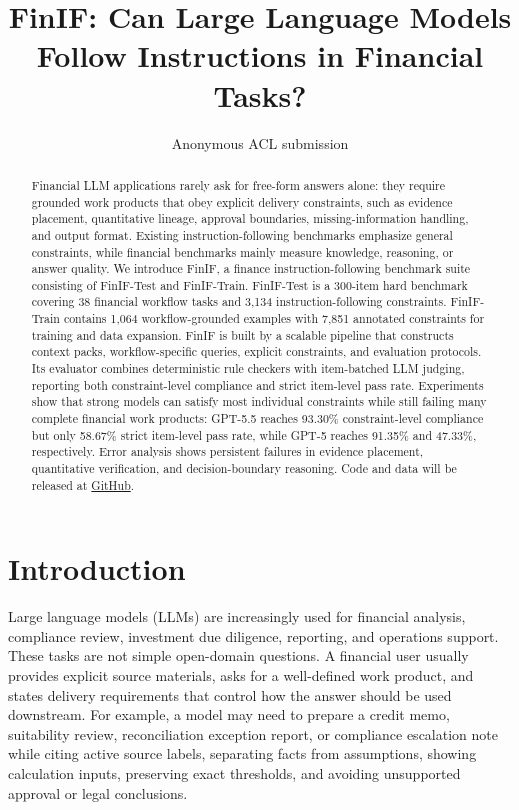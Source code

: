 \documentclass[11pt]{article}
\title{FinIF: Can Large Language Models Follow Instructions in Financial Tasks?}
\author{Anonymous ACL submission}
\date{}
\begin{document}
\maketitle

\begin{abstract}
Financial LLM applications rarely ask for free-form answers alone: they require grounded work products that obey explicit delivery constraints, such as evidence placement, quantitative lineage, approval boundaries, missing-information handling, and output format. Existing instruction-following benchmarks emphasize general constraints, while financial benchmarks mainly measure knowledge, reasoning, or answer quality. We introduce FinIF, a finance instruction-following benchmark suite consisting of FinIF-Test and FinIF-Train. FinIF-Test is a 300-item hard benchmark covering 38 financial workflow tasks and 3,134 instruction-following constraints. FinIF-Train contains 1,064 workflow-grounded examples with 7,851 annotated constraints for training and data expansion. FinIF is built by a scalable pipeline that constructs context packs, workflow-specific queries, explicit constraints, and evaluation protocols. Its evaluator combines deterministic rule checkers with item-batched LLM judging, reporting both constraint-level compliance and strict item-level pass rate. Experiments show that strong models can satisfy most individual constraints while still failing many complete financial work products: GPT-5.5 reaches 93.30\% constraint-level compliance but only 58.67\% strict item-level pass rate, while GPT-5 reaches 91.35\% and 47.33\%, respectively. Error analysis shows persistent failures in evidence placement, quantitative verification, and decision-boundary reasoning. Code and data will be released at \href{xxx}{GitHub}.
\end{abstract}

\section{Introduction}

Large language models (LLMs) are increasingly used for financial analysis, compliance review, investment due diligence, reporting, and operations support. These tasks are not simple open-domain questions. A financial user usually provides explicit source materials, asks for a well-defined work product, and states delivery requirements that control how the answer should be used downstream. For example, a model may need to prepare a credit memo, suitability review, reconciliation exception report, or compliance escalation note while citing active source labels, separating facts from assumptions, showing calculation inputs, preserving exact thresholds, and avoiding unsupported approval or legal conclusions.
\end{document}
